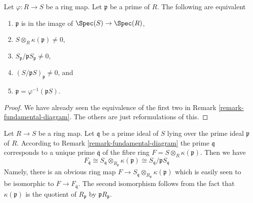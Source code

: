 \begin{lemma}
\label{lemma-in-image}
Let $\varphi : R \to S$ be a ring map. Let $\mathfrak p$
be a prime of $R$. The following are equivalent
\begin{enumerate}
\item $\mathfrak p$ is in the image of
$\Spec(S) \to \Spec(R)$,
\item $S \otimes_R \kappa(\mathfrak p) \not = 0$,
\item $S_{\mathfrak p}/\mathfrak p S_{\mathfrak p} \not = 0$,
\item $(S/\mathfrak pS)_{\mathfrak p} \not = 0$, and
\item $\mathfrak p = \varphi^{-1}(\mathfrak pS)$.
\end{enumerate}
\end{lemma}

\begin{proof}
We have already seen the equivalence of the first two
in Remark \ref{remark-fundamental-diagram}. The others
are just reformulations of this.
\end{proof}

\begin{remark}
\label{remark-local-ring-fibre}
Let $R \to S$ be a ring map. Let $\mathfrak q$ be a prime
ideal of $S$ lying over the prime ideal $\mathfrak p$ of $R$.
According to Remark \ref{remark-fundamental-diagram}
the prime $\mathfrak q$ corresponds to a unique prime
$\overline{\mathfrak q}$ of the fibre ring
$F = S \otimes_R \kappa(\mathfrak p)$.
Then we have
$$
F_{\overline{\mathfrak q}}
\cong S_\mathfrak q \otimes_{R_\mathfrak p} \kappa(\mathfrak p)
\cong S_\mathfrak q/\mathfrak p S_\mathfrak q
$$
Namely, there is an obvious ring map
$F \to S_\mathfrak q \otimes_{R_\mathfrak p} \kappa(\mathfrak p)$
which is easily seen to be isomorphic to $F \to F_{\overline{\mathfrak q}}$.
The second isomorphism follows from the fact that $\kappa(\mathfrak p)$
is the quotient of $R_\mathfrak p$ by $\mathfrak pR_\mathfrak p$.
\end{remark}







